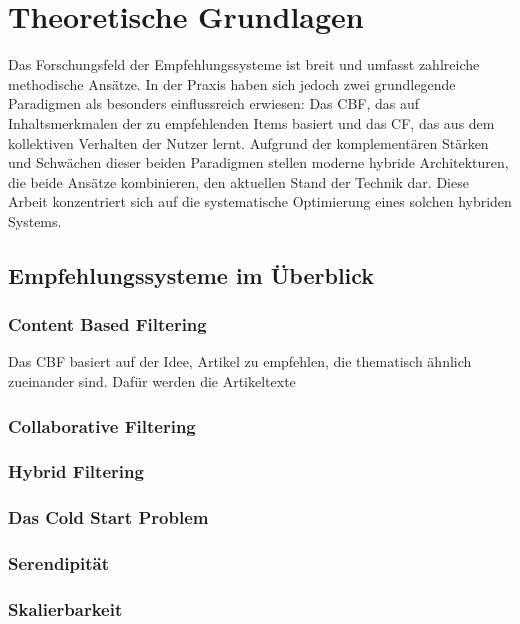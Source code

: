 \section{Theoretische Grundlagen}
Das Forschungsfeld der Empfehlungssysteme ist breit und umfasst zahlreiche methodische
Ansätze. In der Praxis haben sich jedoch zwei grundlegende Paradigmen als besonders einflussreich erwiesen:
Das \ac{CBF}, das auf Inhaltsmerkmalen der zu empfehlenden Items basiert und das \ac{CF}, das aus dem kollektiven
Verhalten der Nutzer lernt. Aufgrund der komplementären Stärken und Schwächen dieser beiden Paradigmen
stellen moderne hybride Architekturen, die beide Ansätze kombinieren, den aktuellen
Stand der Technik dar. Diese Arbeit konzentriert sich auf die systematische Optimierung eines solchen hybriden Systems.

\subsection{Empfehlungssysteme im Überblick}
\subsubsection{Content Based Filtering}
Das \ac{CBF} basiert auf der Idee, Artikel zu empfehlen, die thematisch ähnlich zueinander sind. Dafür werden
die Artikeltexte 
\subsubsection{Collaborative Filtering}

\subsubsection{Hybrid Filtering}

\subsubsection{Das Cold Start Problem}

\subsubsection{Serendipität}
\label{sec:serendipitaet}

\subsubsection{Skalierbarkeit}

